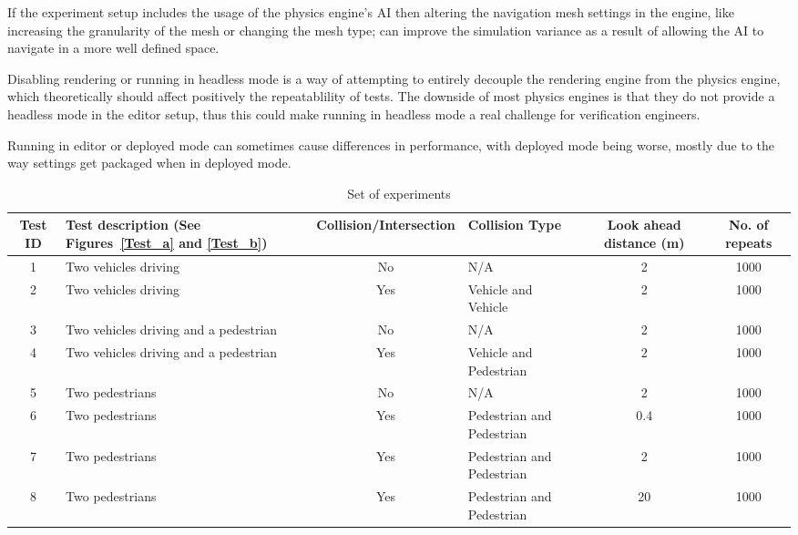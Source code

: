 If the experiment setup includes the usage of the physics engine's AI then altering the navigation mesh settings in the engine, like increasing the granularity of the mesh or changing the mesh type; can improve the simulation variance as a result of allowing the AI to navigate in a more well defined space. 

Disabling rendering or running in headless mode is a way of attempting to entirely decouple the rendering engine from the physics engine, which theoretically should affect positively the repeatablility of tests. 
The downside of most physics engines is that they do not provide a headless mode in the editor setup, thus this could make running in headless mode a real challenge for verification engineers.

Running in editor or deployed mode can sometimes cause differences in performance, with deployed mode being worse, mostly due to the way settings get packaged when in deployed mode.

\begin{table*}[b]
\centering
\begin{tabular}{clclcc}
\toprule
Test ID & Test description (See Figures~\ref{Test_a} and \ref{Test_b}) & Collision/Intersection & Collision Type & Look ahead distance (m) & No. of repeats \\ \midrule
1       & Two vehicles driving                   & No  & N/A & 2 & 1000 \\
2       & Two vehicles driving                   & Yes & Vehicle and Vehicle & 2 & 1000 \\
3       & Two vehicles driving and a pedestrian  & No  & N/A & 2 & 1000 \\
4       & Two vehicles driving and a pedestrian  & Yes & Vehicle and Pedestrian & 2 & 1000 \\
5       & Two pedestrians                        & No  & N/A & 2 & 1000 \\
6       & Two pedestrians                        & Yes & Pedestrian and Pedestrian & 0.4 & 1000 \\
7       & Two pedestrians                        & Yes & Pedestrian and Pedestrian & 2 & 1000 \\
8       & Two pedestrians                        & Yes & Pedestrian and Pedestrian & 20 & 1000 \\
\bottomrule
\end{tabular}
\caption{Set of experiments}
\label{TableOfExperiments}
\end{table*}


